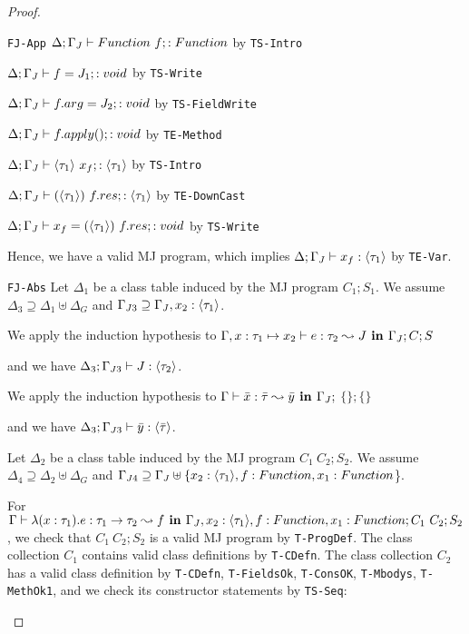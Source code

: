 \begin{proof}
\begin{case}{\texttt{FJ-App}}
$\Delta; \Gamma_J \vdash Function~f; : Function$ by \texttt{TS-Intro}

$\Delta; \Gamma_J \vdash f = J_1; : void$ by \texttt{TS-Write}

$\Delta; \Gamma_J \vdash f.arg = J_2; : void$ by \texttt{TS-FieldWrite}

$\Delta; \Gamma_J \vdash f.apply(); : void$ by \texttt{TE-Method}

$\Delta; \Gamma_J \vdash \langle\tau_1\rangle~x_f; : \langle\tau_1\rangle$ by \texttt{TS-Intro}

$\Delta; \Gamma_J \vdash (\langle\tau_1\rangle)~f.res; : \langle\tau_1\rangle$ by \texttt{TE-DownCast}

$\Delta; \Gamma_J \vdash x_f = (\langle\tau_1\rangle)~f.res; : void$ by \texttt{TS-Write}

Hence, we have a valid MJ program, which implies
 $\Delta; \Gamma_J \vdash x_f : \langle\tau_1\rangle$ by \texttt{TE-Var}.

\end{case}

\begin{case}{\texttt{FJ-Abs}} 
Let $\Delta_1$ be a class table induced by the MJ program $C_1;S_1$.
We assume $\Delta_3 \supseteq \Delta_1 \uplus \Delta_G$
and $\Gamma_{J3} \supseteq \Gamma_{J}, x_2 : \langle\tau_1 \rangle$.

We apply the induction hypothesis to 
$\Gamma , x : \tau_1 \mapsto x_2 \vdash e : \tau_2 \leadsto J \textbf{~in~} \Gamma_{J};C;S$

and we have $\Delta_3; \Gamma_{J3} \vdash J : \langle\tau_2 \rangle$.

We apply the induction hypothesis to 
$\Gamma \vdash \bar{x} : \bar{\tau} \leadsto \bar{y} \textbf{~in~} \Gamma_J;$ $\{\};\{\}$

and we have $\Delta_3; \Gamma_{J3} \vdash \bar{y} : \langle\bar{\tau}\rangle$.

Let $\Delta_2$ be a class table induced by the MJ program $C_1~C_2;S_2$.
We assume $\Delta_4 \supseteq \Delta_2 \uplus \Delta_G$
and $\Gamma_{J4} \supseteq \Gamma_{J} \uplus \{x_2 : \langle\tau_1\rangle, f : Function, 
 x_1 : Function$\}.

For  $\Gamma \vdash \lambda (x:\tau_1).e : \tau_1 \rightarrow \tau_2 \leadsto f 
 \textbf{~in~} \Gamma_J,x_2 : \langle\tau_1\rangle, f : Function, 
 x_1 : Function;C_1~C_2;S_2$,
 we check that $C_1~C_2;S_2$ is a valid MJ program by \texttt{T-ProgDef}.
The class collection $C_1$ contains valid class definitions by \texttt{T-CDefn}.
 The class collection $C_2$ has a valid class definition by \texttt{T-CDefn}, \texttt{T-FieldsOk}, 
\texttt{T-ConsOK}, \texttt{T-Mbodys}, \texttt{T-MethOk1}, and we check its constructor 
 statements by \texttt{TS-Seq}:
 

\end{case}
\end{proof}
